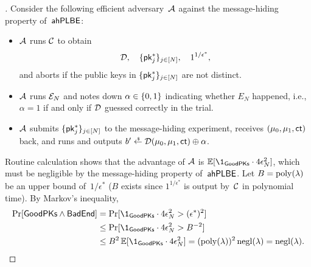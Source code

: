 \begin{proof}[]
Consider the following efficient adversary~${\mathcal{A}}$ against the message-hiding property of~$\AHPLBE$:
\begin{itemize}
\item ${\mathcal{A}}$ runs ${\mathcal{C}}$ to obtain
\begin{align*}
\scriptD,\quad
\{\pk^\ast_j\}_{j\in[N]},\quad
1^{1/\epsilon^\ast},
\end{align*}
and aborts if the public keys in $\{\pk^\ast_j\}_{j\in[N]}$ are not distinct.
\item ${\mathcal{A}}$ runs ${\mathcal{E}}_N$ and
notes down ${\alpha\in{\{0,1\}}}$ indicating whether $E_N$ happened,
i.e., ${\alpha=1}$ if and only if ${\mathcal{D}}$ guessed correctly in the trial.
\item ${\mathcal{A}}$ submits $\{\pk^\ast_j\}_{j\in[N]}$ to the message-hiding experiment, receives $(\mu_0,\mu_1,\ct)$ back, and
runs and outputs ${b'\draws\scriptD(\mu_0,\mu_1,\ct)\oplus\alpha}$.
\end{itemize}
Routine calculation shows that the advantage of ${\mathcal{A}}$ is
${\E[\1_\GoodPKs\cdot 4\epsilon_N^2]}$,
which must be negligible by the message-hiding property of~$\AHPLBE$.
Let ${B=\operatorname{poly}(\lambda)}$ be an upper bound of~$1/\epsilon^\ast$
($B$ exists since $1^{1/\epsilon^\ast}$ is output by~${\mathcal{C}}$ in polynomial time).
By Markov's inequality,
\begin{align*}
\Pr[\GoodPKs\wedge\BadEnd]
&{}=
\Pr[\1_\GoodPKs\cdot 4\epsilon_N^2>(\epsilon^\ast)^2]
\\&{}\leq
\Pr[\1_\GoodPKs\cdot 4\epsilon_N^2>B^{-2}]
\\&{}\leq
B^2\E[\1_\GoodPKs\cdot 4\epsilon_N^2]
\WideNarrow{}{
\\&{}}
=
(\poly(\lambda))^2\negl(\lambda)
=
\negl(\lambda).
\qedhere
\end{align*}
\end{proof}
